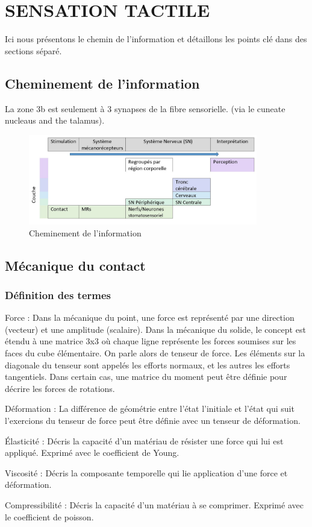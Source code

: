\chapter{SENSATION TACTILE}
Ici nous présentons le chemin de l’information et détaillons les points clé dans des sections séparé.\par

\section{Cheminement de l’information}
La zone 3b est seulement à 3 synapses de la fibre sensorielle. (via le cuneate nucleaus and the talamus).\par
\begin{figure}[!h]
	\centering
	\includegraphics[width=10cm]{1_Bible/Photos/Biology/chemin.jpg}
	\caption{Cheminement de l’information}\label{chemin_info}
\end{figure}

\section{Mécanique du contact}

\subsection{Définition des termes}
Force : Dans la mécanique du point, une force est représenté par une direction (vecteur) et une amplitude (scalaire). Dans la mécanique du solide, le concept est étendu à une matrice 3x3 où chaque ligne représente les forces soumises sur les faces du cube élémentaire. On parle alors de tenseur de force. Les éléments sur la diagonale du tenseur sont appelés les efforts normaux, et les autres les efforts tangentiels. Dans certain cas, une matrice du moment peut être définie pour décrire les forces de rotations.\par
Déformation : La différence de géométrie entre l’état l’initiale et l’état qui suit l’exercions  du tenseur de force peut être définie avec un tenseur de déformation.\par
Élasticité : Décris la capacité d’un matériau de résister une force qui lui est appliqué. Exprimé avec le coefficient de Young.\par
Viscosité : Décris la composante temporelle qui lie application d’une force et déformation.\par
Compressibilité : Décris la capacité d’un matériau à se comprimer. Exprimé avec le coefficient de poisson.\par

